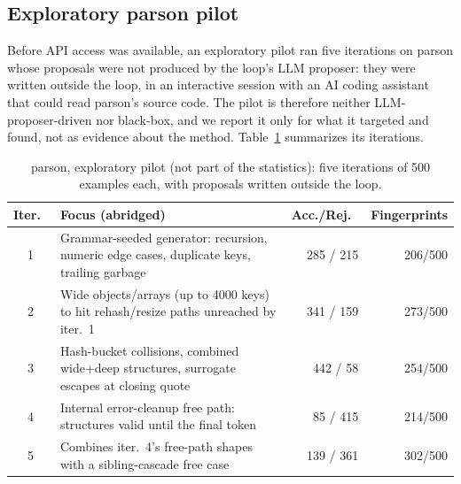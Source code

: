\subsection{Exploratory parson pilot}
\label{sec:evaluation-parson-pilot}

Before API access was available, an exploratory pilot ran five iterations on
parson whose proposals were not produced by the loop's LLM proposer: they
were written outside the loop, in an interactive session with an AI coding
assistant that could read parson's source code. The pilot is therefore
neither LLM-proposer-driven nor black-box, and we report it only for what it
targeted and found, not as evidence about the method.
Table~\ref{tab:parson-iterations} summarizes its iterations.

\begin{table}[t]
\centering
\caption{parson, exploratory pilot (not part of the statistics): five iterations of 500 examples each, with proposals written outside the loop.}
\label{tab:parson-iterations}
\small
\begin{tabularx}{\textwidth}{c X r r}
\toprule
Iter.\ & Focus (abridged) & Acc./Rej.\ & Fingerprints \\
\midrule
1 & Grammar-seeded generator: recursion, numeric edge cases, duplicate keys, trailing garbage & 285 / 215 & 206/500 \\
2 & Wide objects/arrays (up to 4000 keys) to hit rehash/resize paths unreached by iter.\ 1 & 341 / 159 & 273/500 \\
3 & Hash-bucket collisions, combined wide+deep structures, surrogate escapes at closing quote & 442 / 58 & 254/500 \\
4 & Internal error-cleanup free path: structures valid until the final token & 85 / 415 & 214/500 \\
5 & Combines iter.\ 4's free-path shapes with a sibling-cascade free case & 139 / 361 & 302/500 \\
\bottomrule
\end{tabularx}
\end{table}

